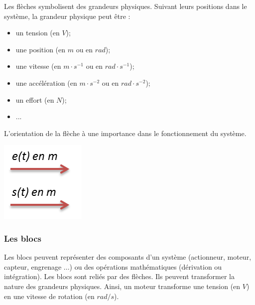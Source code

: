 \documentclass[10pt,fleqn]{article} %
\begin{document}
\begin{minipage}[c]{.7\linewidth}
Les flèches symbolisent des grandeurs physiques. Suivant leurs positions dans le système, la grandeur physique peut être :
\begin{itemize}
\item un tension (en $V$);
\item une position (en $m$ ou en $rad$);
\item une vitesse (en $m\cdot s^{-1}$ ou en $rad\cdot s^{-1}$);
\item une accélération (en $m\cdot s^{-2}$ ou en $rad\cdot s^{-2}$);
\item un effort (en $N$);
\item ...
\end{itemize}
L'orientation de la flèche à une importance dans le fonctionnement du système.
\end{minipage}\hfill
\begin{minipage}[c]{.2\linewidth}
\begin{center}
    \includegraphics[width=.7\textwidth]{images/fleche2}
\end{center}
\end{minipage}

\subsubsection*{Les blocs}

Les blocs peuvent représenter des composants d'un système (actionneur, moteur, capteur, engrenage ...) ou des opérations mathématiques (dérivation ou intégration). Les blocs sont reliés par des flèches. Ils peuvent transformer la nature des grandeurs physiques. Ainsi, un moteur transforme une tension (en $V$) en une vitesse de rotation (en $rad/s$).
\end{document}
